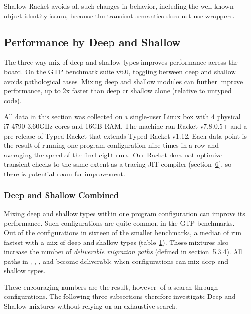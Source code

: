 \documentclass[screen=true, natbib=false, 10pt, sigplan]{acmart}
\newcommand{\ChapRef}[2]{\SecRef{#1}{#2}}
\newcommand{\SecRef}[2]{section~#1}
\newcommand{\SectionNumberLink}[2]{\hyperref[#1]{#2}}
\let\SOriginalthesubsubsection\thesubsubsection
\newcommand{\Ssubsection}[2]{\subsection[#1]{#2}\let\thesubsubsection\SOriginalthesubsubsection}
\newcommand{\Ssubsubsection}[2]{\subsubsection[#1]{#2}}
\newcommand{\FigureRef}[2]{#1}
\begin{document}
Shallow Racket avoids all such changes in behavior,
 including the well{-}known object identity issues,
 because the transient semantics does not use wrappers.

\Ssubsection{Performance by Deep and Shallow}{Performance by Deep and Shallow}\label{t:x28part_x22secx3aevaluationx3aperformancex22x29}

The three{-}way mix of deep and shallow types improves performance
across the board.
On the GTP benchmark suite v6.0,
toggling between deep and shallow avoids
pathological cases.
Mixing deep and shallow modules can further improve performance,
up to 2x faster than deep or shallow alone (relative to untyped code).

All data in this section was collected on a single{-}user Linux box
with 4 physical i7{-}4790 3.60GHz cores and 16GB RAM.
The machine ran Racket v7.8.0.5+
and a pre{-}release of Typed Racket
that extends Typed Racket v1.12.
Each data point is the result of running one program configuration nine times in a row
 and averaging the speed of the final eight runs.
Our Racket does not optimize transient checks to the same extent as
a tracing JIT compiler (\ChapRef{\SectionNumberLink{t:x28part_x22secx3arelatedx22x29}{6}}{Related Work}), so there is potential room for
improvement.

\Ssubsubsection{Deep and Shallow Combined}{Deep and Shallow Combined}\label{t:x28part_x22secx3aevaluationx3aperfx3atogetherx22x29}

Mixing deep and shallow types within one program configuration can improve its
performance.
Such configurations are quite common in the GTP benchmarks.
Out of the  configurations in sixteen of the smaller
benchmarks, a median of  run fastest
with a mix of deep and shallow types (table~\hyperref[t:x28counter_x28x22figurex22_x22figx3abothx3a3wayx22x29x29]{\FigureRef{1}{t:x28counter_x28x22figurex22_x22figx3abothx3a3wayx22x29x29}}).
These mixtures also increase the number of \emph{deliverable migration
paths} (defined in \SecRef{\SectionNumberLink{t:x28part_x22secx3aevaluationx3aperfx3apathx22x29}{5.3.4}}{Migration Paths}).
All paths in , , , and  become deliverable
when configurations can mix deep and shallow types.

These encouraging numbers are the result, however, of a search through
 configurations.
The following three subsections therefore investigate Deep and Shallow
mixtures without relying on an exhaustive search.
\end{document}
